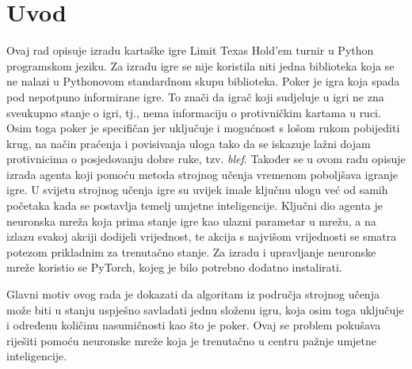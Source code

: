 \section{Uvod}
Ovaj rad opisuje izradu kartaške igre Limit Texas Hold'em turnir u Python programskom jeziku. Za izradu igre se nije koristila niti jedna biblioteka koja se ne nalazi u Pythonovom standardnom skupu biblioteka. Poker je igra koja spada pod nepotpuno informirane igre. To znači da igrač koji sudjeluje u igri ne zna sveukupno stanje o igri, tj., nema informaciju o protivničkim kartama u ruci. Osim toga poker je specifičan jer uključuje i mogućnost s lošom rukom pobijediti krug, na način praćenja i povisivanja uloga tako da se iskazuje lažni dojam protivnicima o posjedovanju dobre ruke, tzv. \emph{blef}. Također se u ovom radu opisuje izrada agenta koji pomoću metoda strojnog učenja vremenom poboljšava igranje igre. U svijetu strojnog učenja igre su uvijek imale ključnu ulogu već od samih početaka kada se postavlja temelj umjetne inteligencije. Ključni dio agenta je neuronska mreža koja prima stanje igre kao ulazni parametar u mrežu, a na izlazu svakoj akciji dodijeli vrijednost, te akcija s najvišom vrijednosti se smatra potezom prikladnim za trenutačno stanje. Za izradu i upravljanje neuronske mreže koristio se PyTorch, kojeg je bilo potrebno dodatno instalirati. 

Glavni motiv ovog rada je dokazati da algoritam iz područja strojnog učenja može biti u stanju uspješno savladati jednu složenu igru, koja osim toga uključuje i određenu količinu nasumičnosti kao što je poker. Ovaj se problem pokušava riješiti pomoću neuronske mreže koja je trenutačno u centru pažnje umjetne inteligencije. 
